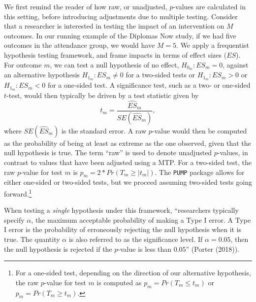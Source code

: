 \documentclass{article}
\begin{document}
We first remind the reader of how raw, or unadjusted, \(p\)-values are
calculated in this setting, before introducing adjustments due to
multiple testing. Consider that a researcher is interested in testing
the impact of an intervention on \(M\) outcomes. In our running example
of the Diplomas Now study, if we had five outcomes in the attendance
group, we would have \(M = 5\). We apply a frequentist hypothesis
testing framework, and frame impacts in terms of effect sizes (\(ES\)).
For outcome \(m\), we can test a null hypothesis of no effect,
\(H_{0_m}: ES_m = 0\), against an alternative hypothesis
\(H_{1_m}: ES_m \neq 0\) for a two-sided tests or \(H_{1_m}: ES_m > 0\)
or \(H_{1_m}: ES_m < 0\) for a one-sided test. A significance test, such
as a two- or one-sided \(t\)-test, would then typically be driven by a
test statistic given by \begin{equation}
t_m = \frac{\widehat{ES}_m}{SE(\hat{ES}_m)},
\end{equation} where \(SE(\hat{ES}_m)\) is the standard error. A raw
\(p\)-value would then be computed as the probability of being at least
as extreme as the one observed, given that the null hypothesis is true.
The term ``raw'' is used to denote unadjusted \(p\)-values, in contrast
to values that have been adjusted using a MTP. For a two-sided test, the
raw \(p\)-value for test \(m\) is \(p_m=2*Pr(T_m \geq |t_m|)\). The
\texttt{PUMP} package allows for either one-sided or two-sided tests,
but we proceed assuming two-sided tests going forward.\footnote{For a
  one-sided test, depending on the direction of our alternative
  hypothesis, the raw \(p\)-value for test \(m\) is computed as
  \(p_m=Pr(T_m \leq t_m)\) or \(p_m=Pr(T_m \geq t_m)\).}

When testing a \emph{single} hypothesis under this framework,
``researchers typically specify \(\alpha\), the maximum acceptable
probability of making a Type I error. A Type I error is the probability
of erroneously rejecting the null hypothesis when it is true. The
quantity \(\alpha\) is also referred to as the significance level. If
\(\alpha=0.05\), then the null hypothesis is rejected if the \(p\)-value
is less than \(0.05\)'' (Porter (2018)).
\end{document}
